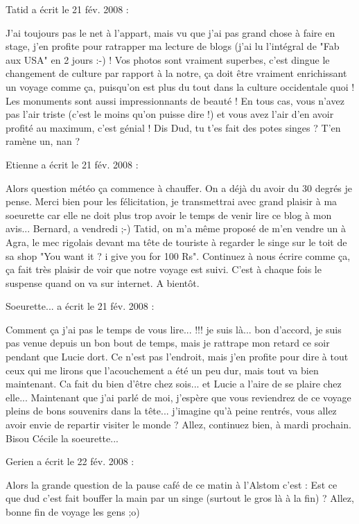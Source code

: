 \medskip
Tatid a écrit le 21 fév. 2008 :
\begin{displayquote}
J'ai toujours pas le net à l'appart, mais vu que j'ai pas grand chose à faire en stage, j'en profite pour ratrapper ma lecture de blogs (j'ai lu l'intégral de "Fab aux USA" en 2 jours :-) !
Vos photos sont vraiment superbes, c'est dingue le changement de culture par rapport à la notre, ça doit être vraiment enrichissant un voyage comme ça, puisqu'on est plus du tout dans la culture occidentale quoi ! Les monuments sont aussi impressionnants de beauté ! En tous cas, vous n'avez pas l'air triste (c'est le moins qu'on puisse dire !) et vous avez l'air d'en avoir profité au maximum, c'est génial !
Dis Dud, tu t'es fait des potes singes ? T'en ramène un, nan ?
\end{displayquote}

\medskip
Etienne a écrit le 21 fév. 2008 :
\begin{displayquote}
Alors question météo ça commence à chauffer. On a déjà du avoir du 30 degrés je pense. Merci bien pour les félicitation, je transmettrai avec grand plaisir à ma soeurette car elle ne doit plus trop avoir le temps de venir lire ce blog à mon avis...
Bernard, a vendredi ;-)
Tatid, on m'a même proposé de m'en vendre un à Agra, le mec rigolais devant ma tête de touriste à regarder le singe sur le toit de sa shop "You want it ? i give you for 100 Rs".
Continuez à nous écrire comme ça, ça fait très plaisir de voir que notre voyage est suivi. C'est à chaque fois le suspense quand on va sur internet. A bientôt.
\end{displayquote}

\medskip
Soeurette... a écrit le 21 fév. 2008 :
\begin{displayquote}
Comment ça j'ai pas le temps de vous lire... !!! je suis là... bon d'accord, je suis pas venue depuis un bon bout de temps, mais je rattrape mon retard ce soir pendant que Lucie dort.
Ce n'est pas l'endroit, mais j'en profite pour dire à tout ceux  qui me lirons que l'acouchement a été un peu dur, mais tout va bien maintenant. Ca fait du bien d'être chez sois... et Lucie a l'aire de se plaire chez elle...
Maintenant que j'ai parlé de moi, j'espère que vous reviendrez de ce voyage pleins de bons souvenirs dans la tête... j'imagine qu'à peine rentrés, vous allez avoir envie de repartir visiter le monde ?
Allez, continuez bien, à mardi prochain.
Bisou
Cécile la soeurette...
\end{displayquote}

\medskip
Gerien a écrit le 22 fév. 2008 :
\begin{displayquote}
Alors la grande question de la pause café de ce matin à l'Alstom c'est :
Est ce que dud c'est fait bouffer la main par un singe (surtout le gros là à la fin) ?
Allez, bonne fin de voyage les gens ;o)
\end{displayquote}

